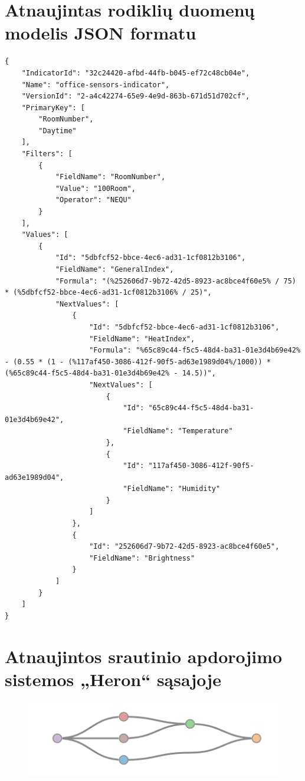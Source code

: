 \documentclass{VUMIFPSbakalaurinis}
\begin{document}
\section{Atnaujintas rodiklių duomenų modelis JSON formatu}\label{add:changed-json}
\begin{lstlisting}
{
    "IndicatorId": "32c24420-afbd-44fb-b045-ef72c48cb04e",
    "Name": "office-sensors-indicator",
    "VersionId": "2-a4c42274-65e9-4e9d-863b-671d51d702cf",
    "PrimaryKey": [
        "RoomNumber",
        "Daytime"
    ],
    "Filters": [
        {
            "FieldName": "RoomNumber",
            "Value": "100Room",
            "Operator": "NEQU"
        }
    ],
    "Values": [
        {
            "Id": "5dbfcf52-bbce-4ec6-ad31-1cf0812b3106",
            "FieldName": "GeneralIndex",
            "Formula": "(%252606d7-9b72-42d5-8923-ac8bce4f60e5% / 75) * (%5dbfcf52-bbce-4ec6-ad31-1cf0812b3106% / 25)",
            "NextValues": [
                {
                    "Id": "5dbfcf52-bbce-4ec6-ad31-1cf0812b3106",
                    "FieldName": "HeatIndex",
                    "Formula": "%65c89c44-f5c5-48d4-ba31-01e3d4b69e42% - (0.55 * (1 - (%117af450-3086-412f-90f5-ad63e1989d04%/1000)) * (%65c89c44-f5c5-48d4-ba31-01e3d4b69e42% - 14.5))",
                    "NextValues": [
                        {
                            "Id": "65c89c44-f5c5-48d4-ba31-01e3d4b69e42",
                            "FieldName": "Temperature"
                        },
                        {
                            "Id": "117af450-3086-412f-90f5-ad63e1989d04",
                            "FieldName": "Humidity"
                        }
                    ]
                },
                {
                    "Id": "252606d7-9b72-42d5-8923-ac8bce4f60e5",
                    "FieldName": "Brightness"
                }
            ]
        }
    ]
}
\end{lstlisting}


\section{Atnaujintos srautinio apdorojimo sistemos „Heron“ sąsajoje}\label{add:generated-system2}
\begin{figure}[H]
    \centering
    \includegraphics[width=1\textwidth]{img/generated-topology-2.png}
    \label{img:generated-data}
\end{figure}
\end{document}
